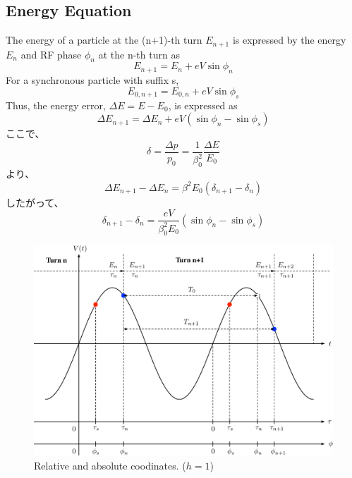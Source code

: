 \documentclass[10pt,a4paper]{ltjsarticle}
\begin{document}
\subsection{Energy Equation}
The energy of a particle at the (n+1)-th turn $E_{n+1}$ is expressed by the energy $E_n$ and RF phase $\phi_n$ at the n-th turn as
%
\begin{equation}
    E_{n+1} = E_n + e V \sin\phi_n
\end{equation}
%
For a synchronous particle with suffix s,
%
\begin{equation}
    E_{0, n+1} = E_{0, n} + e V \sin\phi_s
\end{equation}
%
Thus, the energy error, $\Delta E = E - E_0$, is expressed as
%
\begin{equation}
    \Delta E_{n+1} = \Delta E_n + e V (\sin\phi_n - \sin\phi_s)
\end{equation}
%
ここで、
%
\begin{equation}
    \delta = \frac{\Delta p}{p_0} = \frac{1}{\beta_0^2}\frac{\Delta E}{E_0}
\end{equation}
%
より、
%
\begin{equation}
    \Delta E_{n+1} - \Delta E_n = \beta^2 E_0 (\delta_{n+1} - \delta_n)
\end{equation}
%
したがって、
%
\begin{equation}
    \delta_{n+1} - \delta_n = \frac{e V}{\beta_0^2 E_0}(\sin\phi_n -\sin\phi_s)
\end{equation}
%

\begin{figure}[hbt]
    \begin{center}
      \includegraphics[width=15cm,clip]{coordinates.pdf}
      \caption{Relative and absolute coodinates. ($h=1$)}
      \label{coordinates}
    \end{center}
  \end{figure}
\end{document}
